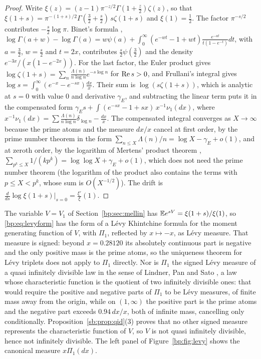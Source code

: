 \begin{proof}
Write $\xi(z)=(z-1)\pi^{-z/2}\Gamma(1+\frac z2)\zeta(z)$, so that $\xi(1+s)=\pi^{-(1+s)/2}\Gamma(\frac32+\frac s2)\,s\zeta(1+s)$ and $\xi(1)=\frac12$. The factor $\pi^{-s/2}$ contributes $-\frac s2\log\pi$. Binet's formula \cite[\S5.9]{DLMF}, $\log\Gamma(a+w)-\log\Gamma(a)=w\psi(a)+\int_0^\infty(e^{-wt}-1+wt)\frac{e^{-at}}{t(1-e^{-t})}dt$, with $a=\frac32$, $w=\frac s2$ and $t=2x$, contributes $\frac s2\psi(\frac32)$ and the density $e^{-3x}/(x(1-e^{-2x}))$. For the last factor, the Euler product gives $\log\zeta(1+s)=\sum_n\frac{\Lambda(n)}{n\log n}e^{-s\log n}$ for $\operatorname{Re} s>0$, and Frullani's integral gives $\log s=\int_0^\infty(e^{-x}-e^{-sx})\frac{dx}x$. Their sum is $\log(s\zeta(1+s))$, which is analytic at $s=0$ with value $0$ and derivative $\gamma_E$, and subtracting the linear term puts it in the compensated form $\gamma_Es+\int(e^{-sx}-1+sx)\,x^{-1}\nu_1(dx)$, where $x^{-1}\nu_1(dx)=\sum\frac{\Lambda(n)}{n\log n}\delta_{\log n}-\frac{dx}x$. The compensated integral converges as $X\to\infty$ because the prime atoms and the measure $dx/x$ cancel at first order, by the prime number theorem in the form $\sum_{n\le X}\Lambda(n)/n=\log X-\gamma_E+o(1)$, and at zeroth order, by the logarithm of Mertens' product theorem \cite[Theorem 429]{boHardyWright}, $\sum_{p^k\le X}1/(kp^k)=\log\log X+\gamma_E+o(1)$, which does not need the prime number theorem (the logarithm of the product also contains the terms with $p\le X<p^k$, whose sum is $O(X^{-1/2})$). The drift is $\frac{d}{ds}\log\xi(1+s)|_{s=0}=\frac{\xi'}\xi(1)$.
\end{proof}

The variable $V=V_1$ of Section~\ref{bp:sec:mellin} has $\mathbb{E} e^{sV}=\xi(1+s)/\xi(1)$, so \eqref{bp:eq:levyform} has the form of a L\'evy Khintchine formula for the moment generating function of $V$, with $\Pi_1$, reflected by $x\mapsto-x$, as L\'evy measure. That measure is signed: beyond $x=0.28120$ its absolutely continuous part is negative and the only positive mass is the prime atoms, so the uniqueness theorem for L\'evy triplets does not apply to $\Pi_1$ directly. Nor is $\Pi_1$ the signed L\'evy measure of a quasi infinitely divisible law in the sense of Lindner, Pan and Sato \cite{LPS18}, a law whose characteristic function is the quotient of two infinitely divisible ones: that would require the positive and negative parts of $\Pi_1$ to be L\'evy measures, of finite mass away from the origin, while on $(1,\infty)$ the positive part is the prime atoms and the negative part exceeds $0.94\,dx/x$, both of infinite mass, cancelling only conditionally. Proposition~\ref{sb:prop:qid}(3) proves that no other signed measure represents the characteristic function of $V$, so $V$ is not quasi infinitely divisible, hence not infinitely divisible. The left panel of Figure~\ref{bp:fig:levy} shows the canonical measure $x\Pi_1(dx)$.


